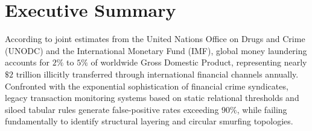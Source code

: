 
\chapter*{Executive Summary}

According to joint estimates from the United Nations Office on Drugs and Crime (UNODC) and the International Monetary Fund (IMF), global money laundering accounts for $2\%$ to $5\%$ of worldwide Gross Domestic Product, representing nearly $\$2\text{ trillion}$ illicitly transferred through international financial channels annually. Confronted with the exponential sophistication of financial crime syndicates, legacy transaction monitoring systems based on static relational thresholds and siloed tabular rules generate false-positive rates exceeding $90\%$, while failing fundamentally to identify structural layering and circular smurfing topologies.

